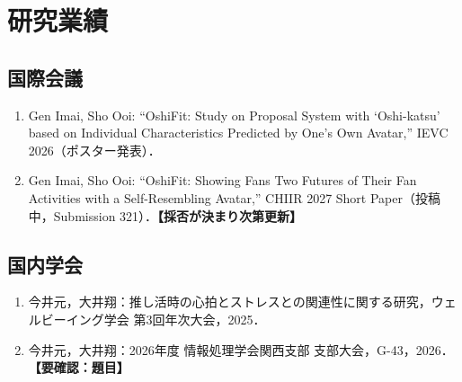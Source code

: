 \documentclass[uplatex,dvipdfmx,a4paper,11pt,openany]{jsreport}
\newcommand{\todo}[1]{\textbf{【#1】}}
\begin{document}



\chapter*{研究業績}
\section*{国際会議}
\begin{enumerate}
\item Gen Imai, Sho Ooi: ``OshiFit: Study on Proposal System with `Oshi-katsu' based on Individual Characteristics Predicted by One's Own Avatar,'' IEVC 2026（ポスター発表）．
\item Gen Imai, Sho Ooi: ``OshiFit: Showing Fans Two Futures of Their Fan Activities with a Self-Resembling Avatar,'' CHIIR 2027 Short Paper（投稿中，Submission 321）．\todo{採否が決まり次第更新}
\end{enumerate}
\section*{国内学会}
\begin{enumerate}
\item 今井元，大井翔：推し活時の心拍とストレスとの関連性に関する研究，ウェルビーイング学会 第3回年次大会，2025．
\item 今井元，大井翔：2026年度 情報処理学会関西支部 支部大会，G-43，2026．\todo{要確認：題目}
\end{enumerate}

\appendix

\end{document}

